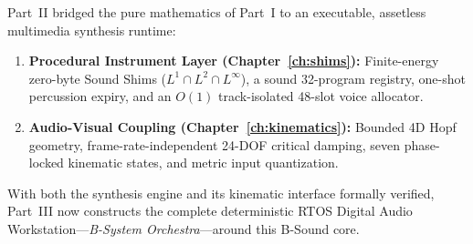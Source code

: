 Part~II bridged the pure mathematics of Part~I to an executable, assetless multimedia synthesis runtime:
\begin{enumerate}[leftmargin=1.5em]
  \item \textbf{Procedural Instrument Layer (Chapter~\ref{ch:shims}):} Finite-energy zero-byte Sound Shims ($L^1 \cap L^2 \cap L^\infty$), a sound 32-program registry, one-shot percussion expiry, and an $O(1)$ track-isolated 48-slot voice allocator.
  \item \textbf{Audio-Visual Coupling (Chapter~\ref{ch:kinematics}):} Bounded 4D Hopf geometry, frame-rate-independent 24-DOF critical damping, seven phase-locked kinematic states, and metric input quantization.
\end{enumerate}
With both the synthesis engine and its kinematic interface formally verified, Part~III now constructs the complete deterministic RTOS Digital Audio Workstation—\emph{B-System Orchestra}—around this B-Sound core.
